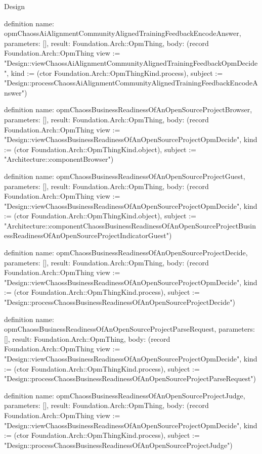 \begin{lexlean}{Design}
\begin{semanticmodule}
definition{
  name: opmChaossAiAlignmentCommunityAlignedTrainingFeedbackEncodeAnswer,
  parameters: [],
  result: Foundation.Arch::OpmThing,
  body: (record Foundation.Arch::OpmThing {view := "Design::viewChaossAiAlignmentCommunityAlignedTrainingFeedbackOpmDecide", kind := (ctor Foundation.Arch::OpmThingKind.process), subject := "Design::processChaossAiAlignmentCommunityAlignedTrainingFeedbackEncodeAnswer"})
}

definition{
  name: opmChaossBusinessReadinessOfAnOpenSourceProjectBrowser,
  parameters: [],
  result: Foundation.Arch::OpmThing,
  body: (record Foundation.Arch::OpmThing {view := "Design::viewChaossBusinessReadinessOfAnOpenSourceProjectOpmDecide", kind := (ctor Foundation.Arch::OpmThingKind.object), subject := "Architecture::componentBrowser"})
}

definition{
  name: opmChaossBusinessReadinessOfAnOpenSourceProjectGuest,
  parameters: [],
  result: Foundation.Arch::OpmThing,
  body: (record Foundation.Arch::OpmThing {view := "Design::viewChaossBusinessReadinessOfAnOpenSourceProjectOpmDecide", kind := (ctor Foundation.Arch::OpmThingKind.object), subject := "Architecture::componentChaossBusinessReadinessOfAnOpenSourceProjectBusinessReadinessOfAnOpenSourceProjectIndicatorGuest"})
}

definition{
  name: opmChaossBusinessReadinessOfAnOpenSourceProjectDecide,
  parameters: [],
  result: Foundation.Arch::OpmThing,
  body: (record Foundation.Arch::OpmThing {view := "Design::viewChaossBusinessReadinessOfAnOpenSourceProjectOpmDecide", kind := (ctor Foundation.Arch::OpmThingKind.process), subject := "Design::processChaossBusinessReadinessOfAnOpenSourceProjectDecide"})
}

definition{
  name: opmChaossBusinessReadinessOfAnOpenSourceProjectParseRequest,
  parameters: [],
  result: Foundation.Arch::OpmThing,
  body: (record Foundation.Arch::OpmThing {view := "Design::viewChaossBusinessReadinessOfAnOpenSourceProjectOpmDecide", kind := (ctor Foundation.Arch::OpmThingKind.process), subject := "Design::processChaossBusinessReadinessOfAnOpenSourceProjectParseRequest"})
}

definition{
  name: opmChaossBusinessReadinessOfAnOpenSourceProjectJudge,
  parameters: [],
  result: Foundation.Arch::OpmThing,
  body: (record Foundation.Arch::OpmThing {view := "Design::viewChaossBusinessReadinessOfAnOpenSourceProjectOpmDecide", kind := (ctor Foundation.Arch::OpmThingKind.process), subject := "Design::processChaossBusinessReadinessOfAnOpenSourceProjectJudge"})
}


\end{semanticmodule}
\end{lexlean}
